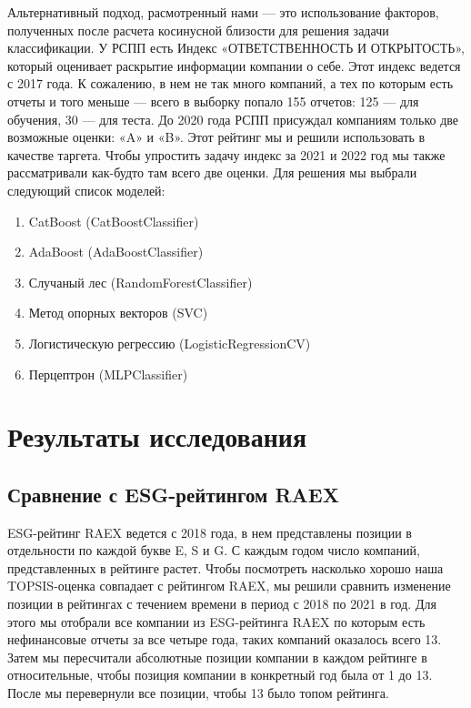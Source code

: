 \documentclass[a4paper, 14pt]{extarticle}
\begin{document}
Альтернативный подход, расмотренный нами ---  это использование факторов, полученных после расчета косинусной близости для решения задачи классификации. У РСПП есть Индекс «ОТВЕТСТВЕННОСТЬ
И ОТКРЫТОСТЬ», который оценивает раскрытие информации компании о себе. Этот индекс ведется с 2017 года. К сожалению, в нем не так много компаний, а тех по которым есть отчеты и того меньше --- всего в выборку попало 155 отчетов: 125 --- для обучения, 30 --- для теста. До 2020 года РСПП присуждал компаниям только две возможные оценки:  «A» и «B». Этот рейтинг мы и решили использовать в качестве таргета. Чтобы упростить задачу индекс за 2021 и 2022 год мы также рассматривали как-будто там всего две оценки. Для решения мы выбрали следующий список моделей:
\begin{enumerate}
    \item CatBoost (CatBoostClassifier)
    \item AdaBoost (AdaBoostClassifier)
    \item Случаный лес (RandomForestClassifier)
    \item Метод опорных векторов (SVC)
    \item Логистическую регрессию (LogisticRegressionCV)
    \item Перцептрон (MLPClassifier)
\end{enumerate}


\section{Результаты исследования}
\subsection{Сравнение с ESG-рейтингом RAEX}

ESG-рейтинг RAEX ведется с 2018 года, в нем представлены позиции в отдельности по каждой букве E, S и G. С каждым годом число компаний, представленных в рейтинге растет. Чтобы посмотреть насколько хорошо наша TOPSIS-оценка совпадает с рейтингом RAEX, мы решили сравнить изменение позиции в рейтингах с течением времени в период с 2018 по 2021 в год. Для этого мы отобрали все компании из ESG-рейтинга RAEX по которым есть нефинансовые отчеты за все четыре года, таких компаний оказалось всего 13. Затем мы пересчитали абсолютные позиции компании в каждом рейтинге в относительные, чтобы позиция компании в конкретный год была от 1 до 13. После мы перевернули все позиции, чтобы 13 было топом рейтинга.

\setcounter{totalnumber}{10}
\setcounter{topnumber}{10}
\end{document}
